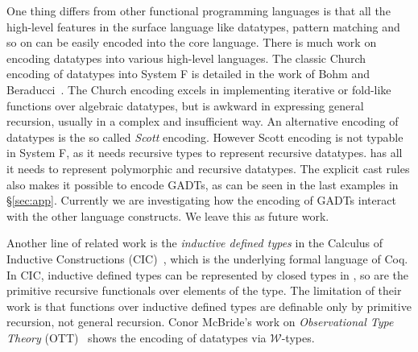 One thing \name differs from other functional programming languages is that all the high-level features in the surface language like datatypes, pattern matching and so on can be easily encoded into the core language. There is much work on encoding datatypes into various high-level languages. The classic Church encoding of datatypes into System F is detailed in the work of Bohm and Beraducci~\cite{Bohm1985}. The Church encoding excels in implementing iterative or fold-like functions over algebraic datatypes, but is awkward in expressing general recursion, usually in a complex and insufficient way. An alternative encoding of datatypes is the so called \emph{Scott} encoding. However Scott encoding is not typable in System F, as it needs recursive types to represent recursive datatypes. \name has all it needs to represent polymorphic and recursive datatypes. The explicit cast rules also makes it possible to encode GADTs, as can be seen in the last examples in \S\ref{sec:app}. Currently we are investigating how the encoding of GADTs interact with the other language constructs. We leave this as future work.

Another line of related work is the \emph{inductive defined types} in
the Calculus of Inductive Constructions (CIC)~\cite{cic}, which is the
underlying formal language of Coq. In CIC, inductive defined types can
be represented by closed types in \coc, so are the primitive recursive
functionals over elements of the type. The limitation of their work is
that functions over inductive defined types are definable only by
primitive recursion, not general recursion. Conor McBride's work on
\emph{Observational Type Theory} (OTT)~\cite{ott} shows the encoding
of datatypes via $\mathcal{W}$-types.

 



